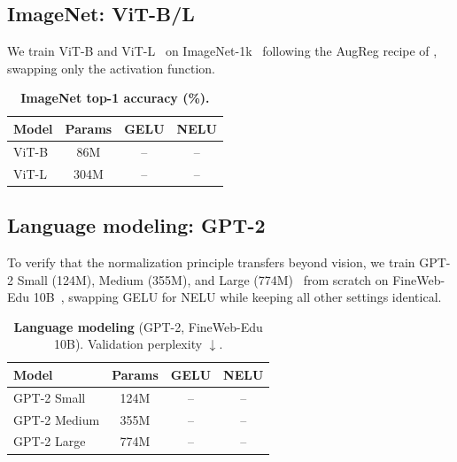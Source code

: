 \subsection{ImageNet: ViT-B/L}\label{sec:imagenet}

We train ViT-B and ViT-L~\citep{dosovitskiy2021image} on ImageNet-1k~\citep{russakovsky2015imagenet} following the AugReg recipe of \citet{steiner2022how}, swapping only the activation function.

\begin{table}[t]
\centering
\caption{\textbf{ImageNet top-1 accuracy (\%).}}
\label{tab:imagenet}
\vspace{0.5em}
\begin{tabular}{lccc}
\toprule
Model & Params & GELU & NELU \\
\midrule
ViT-B & 86M  & -- & -- \\
ViT-L & 304M & -- & -- \\
\bottomrule
\end{tabular}
\end{table}

\subsection{Language modeling: GPT-2}\label{sec:language}

To verify that the normalization principle transfers beyond vision, we train GPT-2 Small (124M), Medium (355M), and Large (774M)~\citep{radford2019language} from scratch on FineWeb-Edu 10B~\citep{penedo2024fineweb}, swapping GELU for NELU while keeping all other settings identical.

\begin{table}[t]
\centering
\caption{\textbf{Language modeling} (GPT-2, FineWeb-Edu 10B). Validation perplexity $\downarrow$.}
\label{tab:language}
\vspace{0.5em}
\begin{tabular}{lccc}
\toprule
Model & Params & GELU & NELU \\
\midrule
GPT-2 Small  & 124M & -- & -- \\
GPT-2 Medium & 355M & -- & -- \\
GPT-2 Large  & 774M & -- & -- \\
\bottomrule
\end{tabular}
\end{table}

